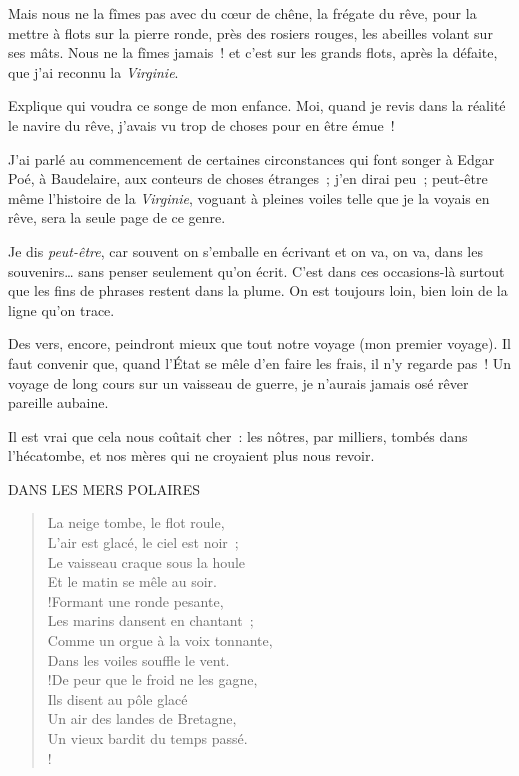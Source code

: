 \documentclass[french,twoside]{book} %
\newcommand{\dateline}[1]{\medskip{\RaggedLeft{#1}\par}\bigskip}
\newenvironment{quoteblock}%
  {\begin{quoting}}
  {\end{quoting}}
\newenvironment{quotebar}{%
    \def\FrameCommand{{\color{rubric!10!}\vrule width 0.5em} \hspace{0.9em}}%
    \def\OuterFrameSep{\itemsep} %
    \MakeFramed {\advance\hsize-\width \FrameRestore}
  }%
  {%
    \endMakeFramed
  }
\renewenvironment{quoteblock}%
  {%
    \savenotes
    \setstretch{0.9}
    \normalfont
    \begin{quotebar}
  }
  {%
    \end{quotebar}
    \spewnotes
  }
\begin{document}
\noindent Mais nous ne la fîmes pas avec du cœur de chêne, la frégate du rêve, pour la mettre à flots sur la pierre ronde, près des rosiers rouges, les abeilles volant sur ses mâts. Nous ne la fîmes jamais ! et c’est sur les grands flots, après la défaite, que j’ai reconnu la \emph{Virginie}.\par
Explique qui voudra ce songe de mon enfance. Moi, quand je revis dans la réalité le navire du rêve, j’avais vu trop de choses pour en être émue !\par
J’ai parlé au commencement de certaines circonstances qui font songer à Edgar Poé, à Baudelaire, aux conteurs de choses étranges ; j’en dirai peu ; peut-être même l’histoire de la \emph{Virginie}, voguant à pleines voiles telle que je la voyais en rêve, sera la seule page de ce genre.\par
Je dis \emph{peut-être}, car souvent on s’emballe en écrivant et on va, on va, dans les souvenirs… sans penser seulement qu’on écrit. C’est dans ces occasions-là surtout que les fins de phrases  restent dans la plume. On est toujours loin, bien loin de la ligne qu’on trace.\par
Des vers, encore, peindront mieux que tout notre voyage (mon premier voyage). Il faut convenir que, quand l’État se mêle d’en faire les frais, il n’y regarde pas ! Un voyage de long cours sur un vaisseau de guerre, je n’aurais jamais osé rêver pareille aubaine.\par
Il est vrai que cela nous coûtait cher : les nôtres, par milliers, tombés dans l’hécatombe, et nos mères qui ne croyaient plus nous revoir.\par

\begin{quoteblock}
DANS LES MERS POLAIRES
\dateline{A bord de la \emph{Virginie}.}
\end{quoteblock}

\begin{verse}
La neige tombe, le flot roule,\\
L’air est glacé, le ciel est noir ;\\
Le vaisseau craque sous la houle\\
Et le matin se mêle au soir.\\!Formant une ronde pesante,\\
Les marins dansent en chantant ;\\
Comme un orgue à la voix tonnante,\\
Dans les voiles souffle le vent.\\!De peur que le froid ne les gagne,\\
Ils disent au pôle glacé\\
Un air des landes de Bretagne,\\
Un vieux bardit du temps passé.\\!
\end{verse}
\begin{quoteblock}
 \end{quoteblock}
\end{document}
